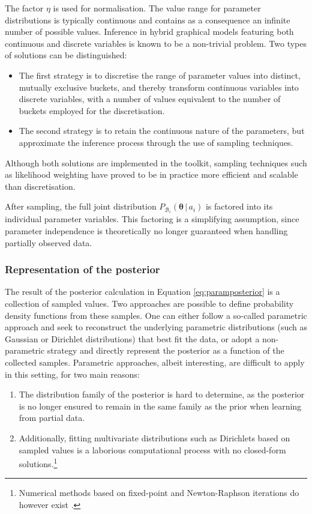 The factor $\eta$ is used for normalisation. The value range for parameter distributions is typically continuous and contains as a consequence an infinite number of possible values. Inference in hybrid graphical models featuring both continuous and discrete variables is known to be a non-trivial problem.  Two types of solutions can be distinguished:
\begin{itemize}
\item The first strategy is to discretise the range of parameter values into distinct, mutually exclusive buckets, and thereby transform continuous variables into discrete variables, with a number of values equivalent to the number of buckets employed for the discretisation.
\item The second strategy is to retain the continuous nature of the parameters, but approximate the inference process through the use of sampling techniques.  
\end{itemize}

Although both solutions are implemented in the \opendial toolkit, sampling techniques such as likelihood weighting have proved to be in practice more efficient and scalable than discretisation. 

After sampling, the full joint distribution $P_{\mathcal{B}_i}(\boldsymbol\theta \, | \, a_i)$ is factored into its individual parameter variables. This factoring is a simplifying assumption, since parameter independence is theoretically no longer guaranteed when handling partially observed data. 

\subsubsection*{Representation of the posterior}

The result of the posterior calculation in Equation \eqref{eq:paramposterior} is a collection of sampled values. Two approaches are possible to define probability density functions from these samples. One can either follow a so-called parametric approach and seek to reconstruct the underlying parametric distributions (such as Gaussian or Dirichlet distributions) that best fit the data, or adopt a non-parametric strategy and directly represent the posterior as a function of the collected samples. Parametric approaches, albeit interesting, are difficult to apply in this setting, for two main reasons:
\begin{enumerate}
\item The distribution family of the posterior is hard to determine, as the posterior is no longer ensured to remain in the same family as the prior when learning from partial data.  
\item Additionally, fitting multivariate distributions such as Dirichlets based on sampled values is a laborious computational process with no closed-form solutions.\footnote{Numerical methods based on fixed-point and Newton-Raphson iterations do however exist \citep{minka2003}.}
\end{enumerate}

